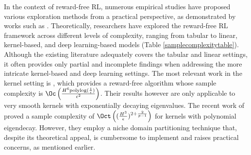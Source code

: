 In the context of reward-free RL, numerous empirical studies have proposed various exploration methods from a practical perspective, as demonstrated by works such as \citep{bellemare2016unifying,pathak2017curiosity,hazan2019provably}. Theoretically, researchers have explored the reward-free RL framework across different levels of complexity, ranging from tabular to linear, kernel-based, and deep learning-based models \citep{jin2020reward,wang2020reward, qiu2021reward} (Table \ref{samplecomplexitytable}). %
Although the existing literature adequately covers the tabular and linear settings, it often provides only partial and incomplete findings when addressing the more intricate kernel-based and deep learning settings. The most relevant work in the kernel setting is \citet{qiu2021reward}, which provides a reward-free algorithm whose sample complexity is $\Oc\left(\frac{H^6 \text{polylog} (\frac{1}{\epsilon})}{\epsilon^2}\right)$. Their results however are only applicable to very smooth kernels with exponentially decaying eigenvalues. The recent work of \citet{vakilireward} proved a sample complexity of $\Oct\left((\frac{H^3}{\epsilon})^{2+\frac{2}{p-1}}\right)$ for kernels with polynomial eigendecay. However, they employ a niche domain partitioning technique that, despite its theoretical appeal, is cumbersome to implement and raises practical concerns, as mentioned earlier.

